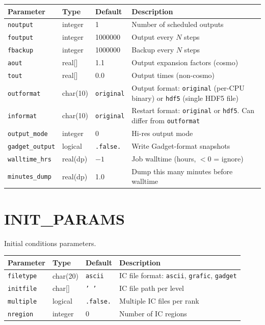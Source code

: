\documentclass[11pt,fleqn]{book}
\begin{document}
\begin{longtable}{L{3.5cm} C{1.8cm} C{1.8cm} L{6cm}}
\toprule
\textbf{Parameter} & \textbf{Type} & \textbf{Default} & \textbf{Description} \\
\midrule
\endhead
\texttt{noutput} & integer & 1 & Number of scheduled outputs \\
\texttt{foutput} & integer & 1000000 & Output every $N$ steps \\
\texttt{fbackup} & integer & 1000000 & Backup every $N$ steps \\
\texttt{aout} & real[] & 1.1 & Output expansion factors (cosmo) \\
\texttt{tout} & real[] & 0.0 & Output times (non-cosmo) \\
\texttt{outformat} & char(10) & \texttt{original} & Output format: \texttt{original} (per-CPU binary) or \texttt{hdf5} (single HDF5 file) \\
\texttt{informat} & char(10) & \texttt{original} & Restart format: \texttt{original} or \texttt{hdf5}. Can differ from \texttt{outformat} \\
\texttt{output\_mode} & integer & 0 & Hi-res output mode \\
\texttt{gadget\_output} & logical & \texttt{.false.} & Write Gadget-format snapshots \\
\texttt{walltime\_hrs} & real(dp) & $-1$ & Job walltime (hours, $<0$ = ignore) \\
\texttt{minutes\_dump} & real(dp) & 1.0 & Dump this many minutes before walltime \\
\bottomrule
\end{longtable}


\chapter{INIT\_PARAMS}

Initial conditions parameters.

\begin{longtable}{L{3.5cm} C{1.8cm} C{1.8cm} L{6cm}}
\toprule
\textbf{Parameter} & \textbf{Type} & \textbf{Default} & \textbf{Description} \\
\midrule
\endhead
\texttt{filetype} & char(20) & \texttt{ascii} & IC file format: \texttt{ascii}, \texttt{grafic}, \texttt{gadget} \\
\texttt{initfile} & char[] & \texttt{' '} & IC file path per level \\
\texttt{multiple} & logical & \texttt{.false.} & Multiple IC files per rank \\
\texttt{nregion} & integer & 0 & Number of IC regions \\
\bottomrule
\end{longtable}
\end{document}
